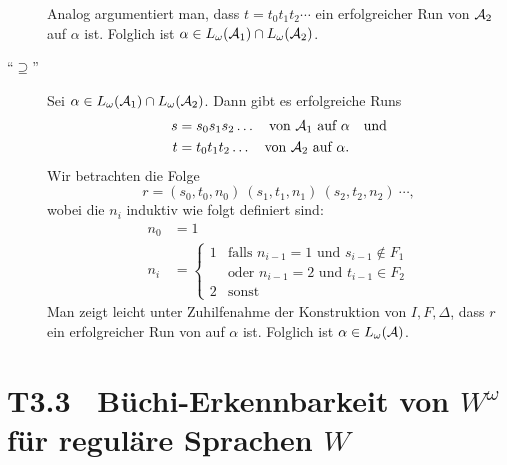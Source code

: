 \documentclass[fontsize=11pt, twoside=false, numbers=autoenddot]{scrbook}
\begin{document}
\begin{description}
      Analog argumentiert man, dass $t = t_0t_1t_2\cdots$
      ein erfolgreicher Run von $\mathcal{A}_2$ auf $\alpha$ ist.
      Folglich ist $\alpha \in L_\omega(\mathcal{A}_1) \cap L_\omega(\mathcal{A}_2)$.
    \item[{\boldmath"`$\supseteq$"'}]
      Sei $\alpha \in L_\omega(\mathcal{A}_1) \cap L_\omega(\mathcal{A}_2)$.
      Dann gibt es erfolgreiche Runs
      \begin{align*}
        s & = s_0s_1s_2\dots \quad \text{von $\mathcal{A}_1$ auf $\alpha$\quad und} \\
        t & = t_0t_1t_2\dots \quad \text{von $\mathcal{A}_2$ auf $\alpha$.}
      \end{align*}
      Wir betrachten die Folge
      \[
        r = (s_0,t_0,n_0)~(s_1,t_1,n_1)~(s_2,t_2,n_2)~\cdots,
      \]
      wobei die $n_i$ induktiv wie folgt definiert sind:
      \begin{align*}
        n_0 & = 1 \\
        n_i & = \begin{cases}
                  1 & \text{falls~} n_{i-1} = 1 \text{~und~} s_{i-1} \notin F_1 \\
                    & \text{oder~}  n_{i-1} = 2 \text{~und~} t_{i-1} \in F_2 \\
                  2 & \text{sonst}
                \end{cases}
      \end{align*}
      Man zeigt leicht unter Zuhilfenahme der Konstruktion von $I,F,\Delta$,
      dass $r$ ein erfolgreicher Run von \Amc auf $\alpha$ ist.
      Folglich ist $\alpha \in L_\omega(\mathcal{A})$.
      \qedhere
  \end{description}

\section*{T3.3~ Büchi-Erkennbarkeit von {\boldmath $W^\omega$ für reguläre Sprachen $W$}}
\end{document}
